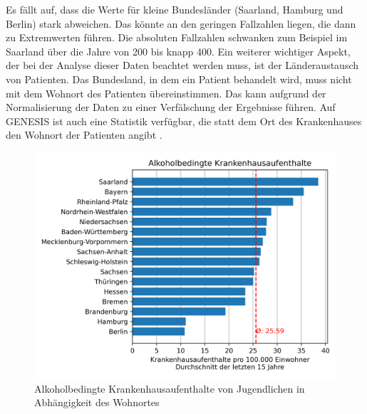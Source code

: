 \documentclass[12pt]{article}
\begin{document}
Es fällt auf, dass die Werte für kleine Bundesländer (Saarland, Hamburg und Berlin) stark abweichen. Das könnte an den geringen Fallzahlen liegen, die dann zu Extremwerten führen. Die absoluten Fallzahlen schwanken zum Beispiel im Saarland über die Jahre von 200 bis knapp 400. Ein weiterer wichtiger Aspekt, der bei der Analyse dieser Daten beachtet werden muss, ist der Länderaustausch von Patienten. Das Bundesland, in dem ein Patient behandelt wird, muss nicht mit dem Wohnort des Patienten übereinstimmen. Das kann aufgrund der Normalisierung der Daten zu einer Verfälschung der Ergebnisse führen. Auf GENESIS ist auch eine Statistik verfügbar, die statt dem Ort des Krankenhauses den Wohnort der Patienten angibt \autocite{noauthor_genesis_nodate-1}.

\begin{figure}[H]
    \centering
    \includegraphics[scale=.7]{"assets/Alkohol_Wohnort_avg_15_Jahre.png"}
    \caption{Alkoholbedingte Krankenhausaufenthalte von Jugendlichen in Abhängigkeit des Wohnortes}
    \label{fig:Krankenhausaufenthalte_2}
\end{figure}
\end{document}
